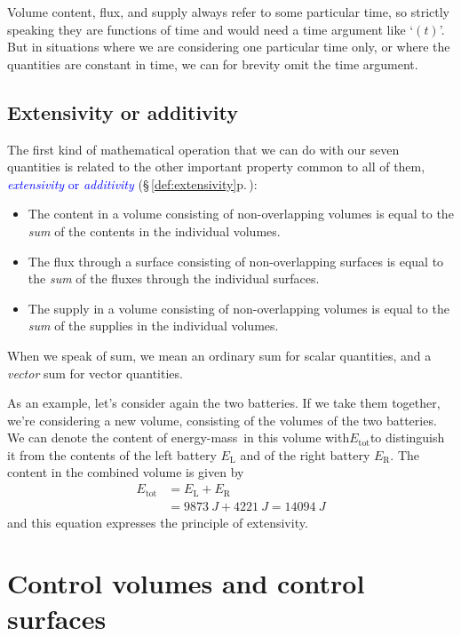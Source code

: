 \documentclass[a4paper,12pt,%
onecolumn,oneside,%
british%
]{memoir}
\renewcommand*{\|}[1][]{\nonscript\:#1\vert\nonscript\:\mathopen{}}
\newcommand*{\sect}{\S}%
\renewcommand*{\autoref}[3][\sect\,\ref]{\textcolor{blue}{#3} {\color{blue}\scriptsize(\faIcon[regular]{eye}\;#1{#2}\;p.\,\pageref{#2})}}
\newcommand*{\energym}{energy-mass}
\newcommand*{\yE}{E}
\begin{document}
Volume content, flux, and supply always refer to some particular time, so strictly speaking they are functions of time and would need a time argument like \enquote*{$(t)$}. But in situations where we are considering one particular time only, or where the quantities are constant in time, we can for brevity omit the time argument.


\subsection{Extensivity or additivity}
\label{sec:extens_sum}

The first kind of mathematical operation that we can do with our seven quantities is related to the other important property common to all of them, \autoref{def:extensivity}{\emph{extensivity} or \emph{additivity}}:
\begin{itemize}
\item The content in a volume consisting of non-overlapping volumes is equal to the \emph{sum} of the contents in the individual volumes.
\item The flux through a surface consisting of non-overlapping surfaces is equal to the \emph{sum} of the fluxes through the individual surfaces.
\item The supply in a volume consisting of non-overlapping volumes is equal to the \emph{sum} of the supplies in the individual volumes.
\end{itemize}
When we speak of sum, we mean an ordinary sum for scalar quantities, and a \emph{vector} sum for vector quantities.

As an example, let's consider again the two batteries. If we take them together, we're considering a new volume, consisting of the volumes of the two batteries. We can denote the content of \energym\ in this volume with\enskip$\yE_{\text{tot}}$\enskip to distinguish it from the contents of the left battery $\yE_{\text{L}}$ and of the right battery $\yE_{\text{R}}$. The content in the combined volume is given by
\begin{equation*}
  \begin{split}
    \yE_{\text{tot}} &= \yE_{\text{L}} + \yE_{\text{R}}
    \\ &= \qty{9873}{J} + \qty{4221}{J}
    = \qty{14094}{J}
  \end{split}
\end{equation*}
and this equation expresses the principle of extensivity.

\section{Control volumes and control surfaces}
\label{sec_controlvolumes_surfaces}
\end{document}
